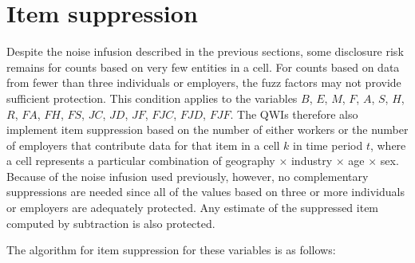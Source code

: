 \section{Item suppression}

\label{sec:disclosure:cell_suppression} 

Despite the noise infusion described in the previous sections, some
disclosure risk remains for counts based on very few entities in a cell. For
counts based on data from fewer than three individuals or employers, the
fuzz factors may not provide sufficient protection. This condition applies
to the variables $B$, $E$, $M$, $F$, $A$, $S$, $H$, $R$, $FA$, $FH$, $FS$, $%
JC$, $JD$, $JF$, $FJC$, $FJD$, $FJF$. The QWIs therefore also implement item
suppression based on the number of either workers or the number of employers
that contribute data for that item in a cell $k$ in time period $t$, where a
cell represents a particular combination of geography $\times $ industry $%
\times $ age $\times $ sex. Because of the noise infusion used previously,
however, no complementary suppressions are needed since all of the values
based on three or more individuals or employers are adequately protected.
Any estimate of the suppressed item computed by subtraction is also
protected.

The algorithm for item suppression for these variables 
is as follows:

%
% 
%

